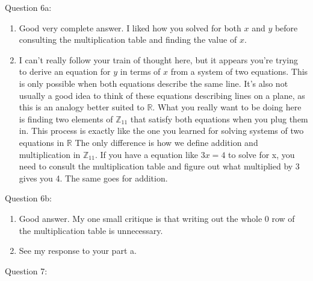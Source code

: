 \documentclass[11pt] {article}
\newcommand{\R}{\mathbb{R}}
\newcommand{\Z}{\mathbb{Z}}
\begin{document}
Question 6a:
\begin{enumerate}
\item Good very complete answer. I liked how you solved for both $x$ and $y$ before consulting the multiplication table and finding the value of $x$.
\item I can't really follow your train of thought here, but it appears you're trying to derive an equation for $y$ in terms of $x$ from a system of two equations. This is only possible when both equations describe the same line. It's also not usually a good idea to think of these equations describing lines on a plane, as this is an analogy better suited to $\R$. What you really want to be doing here is finding two elements of $\Z_{11}$ that satisfy both equations when you plug them in. This process is exactly like the one you learned for solving systems of two equations in $\R$ The only difference is how we define addition and multiplication in $\Z_{11}$. If you have a equation like $3x = 4$ to solve for x, you need to consult the multiplication table and figure out what multiplied by 3 gives you 4. The same goes for addition.
\end{enumerate}
Question 6b:
\begin{enumerate}
\item Good answer. My one small critique is that writing out the whole $0$ row of the multiplication table is unnecessary.
\item See my response to your part a.
\end{enumerate}
Question 7:
\end{document}
